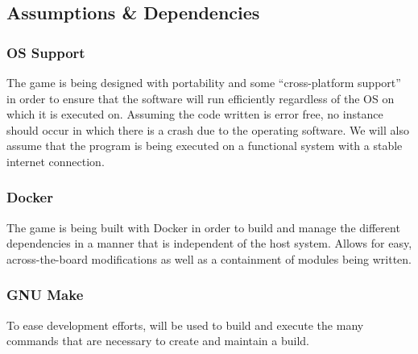 \subsection{Assumptions \& Dependencies}
\subsubsection{OS Support}
The game is being designed with portability and some ``cross-platform support''
in order to ensure that the software will run efficiently regardless of the OS
on which it is executed on. Assuming the code written is error free, no
instance should occur in which there is a crash due to the operating software.
We will also assume that the program is being executed on a functional system
with a stable internet connection.

\subsubsection{Docker}
The game is being built with Docker in order to build and manage the different
dependencies in a manner that is independent of the host system. Allows for
easy, across-the-board modifications as well as a containment of modules being
written.

\subsubsection{GNU Make}
To ease development efforts,  will be used to build and execute the
many commands that are necessary to create and maintain a build.
